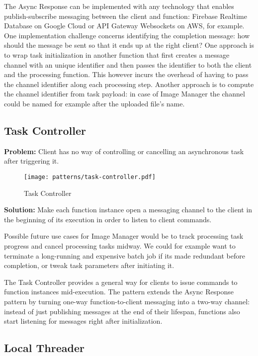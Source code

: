The Async Response can be implemented with any technology that enables publish-subscribe messaging between the client and function: Firebase Realtime Database on Google Cloud or API Gateway Websockets on AWS, for example. One implementation challenge concerns identifying the completion message: how should the message be sent so that it ends up at the right client? One approach is to wrap task initialization in another function that first creates a message channel with an unique identifier and then passes the identifier to both the client and the processing function. This however incurs the overhead of having to pass the channel identifier along each processing step. Another approach is to compute the channel identifier from task payload: in case of Image Manager the channel could be named for example after the uploaded file's name.

\subsection{Task Controller} \label{subsec:taskManager}

\textbf{Problem:} Client has no way of controlling or cancelling an asynchronous task after triggering it.

\begin{figure}[h]
  \centering
  \texttt{[image: patterns/task-controller.pdf]}
  \caption{Task Controller}
  \label{fig:taskController}
\end{figure}

\textbf{Solution:} Make each function instance open a messaging channel to the client in the beginning of its execution in order to listen to client commands.

Possible future use cases for Image Manager would be to track processing task progress and cancel processing tasks midway. We could for example want to terminate a long-running and expensive batch job if its made redundant before completion, or tweak task parameters after initiating it.

The Task Controller provides a general way for clients to issue commands to function instances mid-execution. The pattern extends the Async Response pattern by turning one-way function-to-client messaging into a two-way channel: instead of just publishing messages at the end of their lifespan, functions also start listening for messages right after initialization.

\subsection{Local Threader} \label{subsec:LocalThreads}

